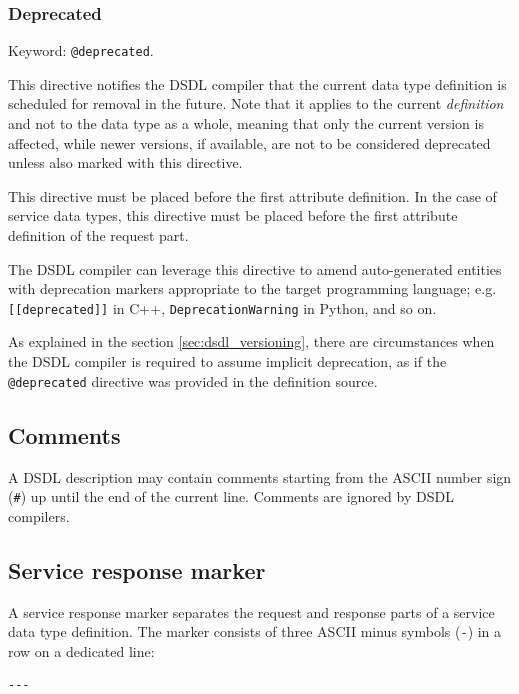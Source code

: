 \subsubsection{Deprecated}

Keyword: \verb|@deprecated|.

This directive notifies the DSDL compiler that the current data type definition
is scheduled for removal in the future.
Note that it applies to the current \emph{definition} and not to the data type as a whole,
meaning that only the current version is affected, while newer versions,
if available, are not to be considered deprecated unless also marked with this directive.

This directive must be placed before the first attribute definition.
In the case of service data types, this directive must be placed before the first
attribute definition of the request part.

The DSDL compiler can leverage this directive to amend auto-generated entities with
deprecation markers appropriate to the target programming language;
e.g. \verb|[[deprecated]]| in C++, \verb|DeprecationWarning| in Python, and so on.

As explained in the section \ref{sec:dsdl_versioning},
there are circumstances when the DSDL compiler is required to assume implicit deprecation,
as if the \verb|@deprecated| directive was provided in the definition source.

\subsection{Comments}

A DSDL description may contain comments starting from the ASCII number sign (\verb|#|)
up until the end of the current line.
Comments are ignored by DSDL compilers.

\subsection{Service response marker}\label{sec:dsdl_service_response_marker}

A service response marker separates the request and response parts of a service data type definition.
The marker consists of three ASCII minus symbols (\verb|-|) in a row on a dedicated line:

\begin{verbatim}
---
\end{verbatim}

